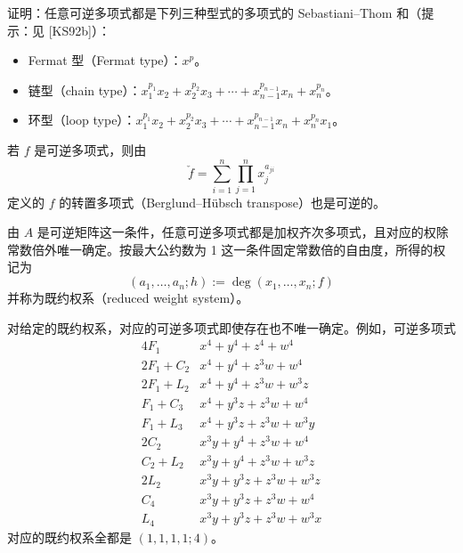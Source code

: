 \begin{exercise}
证明：任意可逆多项式都是下列三种型式的多项式的 Sebastiani–Thom 和（提示：见 [KS92b]）：
\begin{itemize}
\item Fermat 型（Fermat type）：$x^{p}$。
\item 链型（chain type）：$x_1^{p_1}x_2+x_2^{p_2}x_3+\cdots+x_{n-1}^{p_{n-1}}x_n+x_n^{p_n}$。
\item 环型（loop type）：$x_1^{p_1}x_2+x_2^{p_2}x_3+\cdots+x_{n-1}^{p_{n-1}}x_n+x_n^{p_n}x_1$。
\end{itemize}
\end{exercise}

若 $f$ 是可逆多项式，则由
\begin{equation}
    \check f=\sum_{i=1}^{n}\prod_{j=1}^{n}x_j^{a_{ji}} \tag{10.3}
\end{equation}
定义的 $f$ 的转置多项式（Berglund–Hübsch transpose）也是可逆的。

由 $A$ 是可逆矩阵这一条件，任意可逆多项式都是加权齐次多项式，且对应的权除常数倍外唯一确定。按最大公约数为 1 这一条件固定常数倍的自由度，所得的权记为
\begin{equation}
    (a_1,\ldots,a_n;h):=\deg(x_1,\ldots,x_n;f) \tag{10.4}
\end{equation}
并称为既约权系（reduced weight system）。

对给定的既约权系，对应的可逆多项式即使存在也不唯一确定。例如，可逆多项式
\begin{equation}
    \begin{array}{r|l}
        4F_1 & x^4+y^4+z^4+w^4 \\
        2F_1+C_2 & x^4+y^4+z^3w+w^4 \\
        2F_1+L_2 & x^4+y^4+z^3w+w^3z \\
        F_1+C_3 & x^4+y^3z+z^3w+w^4 \\
        F_1+L_3 & x^4+y^3z+z^3w+w^3y \\
        2C_2 & x^3y+y^4+z^3w+w^4 \\
        C_2+L_2 & x^3y+y^4+z^3w+w^3z \\
        2L_2 & x^3y+y^3z+z^3w+w^3z \\
        C_4 & x^3y+y^3z+z^3w+w^4 \\
        L_4 & x^3y+y^3z+z^3w+w^3x
    \end{array}
    \tag{10.5}
\end{equation}
对应的既约权系全都是 $(1,1,1,1;4)$。

